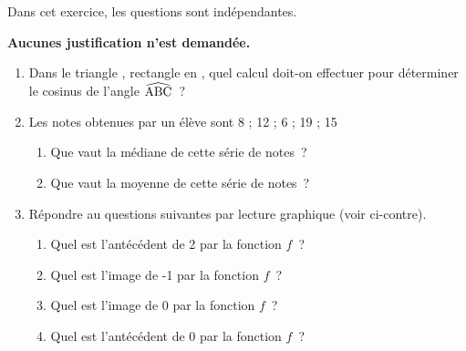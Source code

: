 \documentclass[A4]{dnbqcm}
\begin{document}
\noindent Dans cet exercice, les questions sont indépendantes.\par\noindent
\textbf{Aucunes justification n'est demandée.}
\begin{enumerate}
    \item \begin{minipage}[t]{.5\linewidth}
        Dans le triangle , rectangle en
        , quel calcul doit-on effectuer pour
        déterminer le cosinus de l'angle $\widehat{\text{ABC}}$~?
    \end{minipage}
    \answerspace{1em}
    \item Les notes obtenues par un élève sont 8 ; 12 ; 6 ; 19 ; 15\par
    \begin{enumerate}
        \item Que vaut la médiane de cette série de notes~?
        \answerspace{1em}
        \item Que vaut la moyenne de cette série de notes~?
        \answerspace{1em}
    \end{enumerate}
    \item \begin{minipage}[t]{.5\linewidth}
        Répondre au questions suivantes par lecture graphique (voir ci-contre).
        \begin{enumerate}
            \item Quel est l'antécédent de 2 par la fonction $f$~?
            \answerspace{1em}
            \item Quel est l'image de -1 par la fonction $f$~?
            \answerspace{1em}
            \item Quel est l'image de 0 par la fonction $f$~?
            \answerspace{1em}
            \item Quel est l'antécédent de 0 par la fonction $f$~?
            \answerspace{1em}
        \end{enumerate}
    \end{minipage}\hskip30pt
    \begin{tikzpicture}[scale=0.9, baseline=(current bounding box.north)]

\end{tikzpicture}
\end{enumerate}
\end{document}
